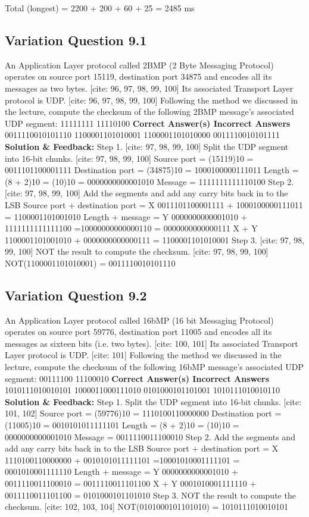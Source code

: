 Total (longest) = 2200 + 200 + 60 + 25 = 2485 ms

\subsection{Variation Question 9.1}

An Application Layer protocol called 2BMP (2 Byte Messaging Protocol) 
operates on source port 15119, destination port 34875 and encodes all 
its messages as two bytes. [cite: 96, 97, 98, 99, 100] Its associated Transport Layer protocol is 
UDP. [cite: 96, 97, 98, 99, 100] Following the method we discussed in the lecture, compute the 
checksum of the following 2BMP message’s associated UDP segment: 
11111111 
11110100
\textbf{Correct Answer(s) Incorrect Answers}
0011110010101110 1100001101010001
1100001101010000
0011110010101111
\textbf{Solution \& Feedback:}
Step 1. [cite: 97, 98, 99, 100] Split the UDP segment into 16-bit chunks. [cite: 97, 98, 99, 100]
Source port 
= (15119)10
= 0011101100001111
Destination port
= (34875)10
= 1000100000111011
Length 
= (8 + 2)10
= (10)10
= 0000000000001010
Message
= 1111111111110100
Step 2. [cite: 97, 98, 99, 100] Add the segments and add any carry bits back in to the LSB
Source port + destination port = X
 0011101100001111
+ 1000100000111011
= 1100001101001010
Length + message = Y
 0000000000001010
+ 1111111111111100
=10000000000000110
= 0000000000000111
X + Y
 1100001101001010
+ 0000000000000111
= 1100001101010001
Step 3. [cite: 97, 98, 99, 100] NOT the result to compute the checksum. [cite: 97, 98, 99, 100]
NOT(1100001101010001)
 = 0011110010101110
\subsection{Variation Question 9.2}

An Application Layer protocol called 16bMP (16 bit Messaging Protocol) 
operates on source port 59776, destination port 11005 and encodes all 
its messages as sixteen bits (i.e. two bytes). [cite: 100, 101] Its associated Transport 
Layer protocol is UDP. [cite: 101] Following the method we discussed in the lecture, 
compute the checksum of the following 16bMP message’s associated 
UDP segment:
00111100 
11100010
\textbf{Correct Answer(s) Incorrect Answers}
1010111010010101 1000011000111010
0101000101101001
1010111010010110
\textbf{Solution \& Feedback:}
Step 1. Split the UDP segment into 16-bit chunks. [cite: 101, 102]
Source port 
= (59776)10
= 1110100110000000
Destination port
= (11005)10
= 0010101011111101
Length 
= (8 + 2)10
= (10)10
= 0000000000001010
Message
= 0011110011100010
Step 2. Add the segments and add any carry bits back in to the LSB
Source port + destination port = X
 1110100110000000
+ 0010101011111101
=10001010001111101
= 0001010001111110
Length + message = Y
 0000000000001010
+ 0011110011100010
= 0011110011101100
X + Y
 0001010001111110
+ 0011110011101100
= 0101000101101010
Step 3. NOT the result to compute the checksum. [cite: 102, 103, 104]
NOT(0101000101101010)
 = 1010111010010101
